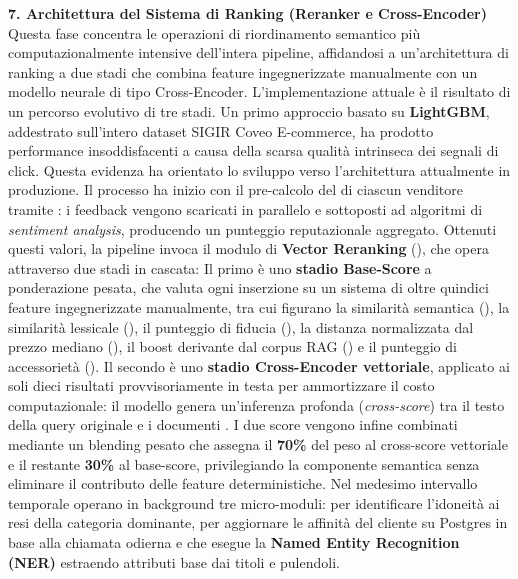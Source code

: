\vspace{0.4cm}
\noindent
\textbf{7. Architettura del Sistema di Ranking (Reranker e Cross-Encoder)}\\
Questa fase concentra le operazioni di riordinamento semantico
più computazionalmente intensive dell'intera pipeline, affidandosi
a un'architettura di ranking a due stadi che combina feature
ingegnerizzate manualmente con un modello neurale di tipo Cross-Encoder.
L'implementazione attuale è il risultato di un percorso evolutivo
di tre stadi. Un primo approccio basato su \textbf{LightGBM},
addestrato sull'intero dataset SIGIR Coveo E-commerce,
ha prodotto performance insoddisfacenti a causa della scarsa qualità
intrinseca dei segnali di click. Questa evidenza ha orientato lo sviluppo verso l'architettura attualmente in produzione.
Il processo ha inizio con il pre-calcolo del  di
ciascun venditore tramite : i
feedback vengono scaricati in parallelo e sottoposti ad
algoritmi di \textit{sentiment analysis}, producendo un punteggio
reputazionale aggregato. Ottenuti questi valori, la pipeline invoca il modulo di
\textbf{Vector Reranking} (), che opera
attraverso due stadi in cascata:
Il primo è uno \textbf{stadio Base-Score} a ponderazione pesata,
che valuta ogni inserzione su un sistema di oltre quindici feature
ingegnerizzate manualmente, tra cui figurano la similarità
semantica (), la similarità lessicale
(), il punteggio di fiducia (), la distanza normalizzata dal prezzo mediano
(), il boost derivante dal corpus RAG
() e il punteggio di accessorietà
(). Il secondo è uno \textbf{stadio
Cross-Encoder vettoriale}, applicato ai soli dieci risultati
provvisoriamente in testa per ammortizzare il costo computazionale:
il modello  genera un'inferenza
profonda (\emph{cross-score}) tra il testo della query originale
e i documenti . I due score vengono infine combinati mediante un blending
pesato che assegna il \textbf{70\%} del peso al cross-score
vettoriale e il restante \textbf{30\%} al base-score,
privilegiando la componente semantica senza eliminare il contributo delle feature deterministiche.
Nel medesimo intervallo temporale operano in background tre micro-moduli:  per identificare l'idoneità ai resi della categoria dominante,  per aggiornare le affinità del cliente su Postgres in base alla chiamata odierna e  che esegue la \textbf{Named Entity Recognition (NER)} estraendo attributi base dai titoli e pulendoli.

